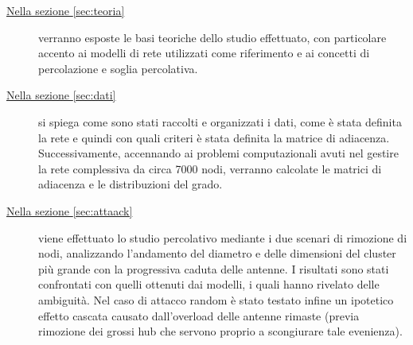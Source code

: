 \begin{description}
\item[{\hyperref[sec:teoria]{Nella sezione \ref{sec:teoria}}}] verranno esposte le basi teoriche dello studio effettuato, con particolare accento ai modelli di rete utilizzati come riferimento e ai concetti di percolazione e soglia percolativa.

\item[{\hyperref[sec:dati]{Nella sezione \ref{sec:dati}}}] si spiega come sono stati raccolti e organizzati i dati, come è stata definita la rete e quindi con quali criteri è stata definita la matrice di adiacenza. Successivamente, accennando ai problemi computazionali avuti nel gestire la rete complessiva da circa 7000 nodi, verranno calcolate le matrici di adiacenza e le distribuzioni del grado.

\item[{\hyperref[sec:attaack]{Nella sezione \ref{sec:attaack}}}] viene effettuato lo studio percolativo mediante i due scenari di rimozione di nodi,  analizzando l'andamento del diametro e delle dimensioni del cluster più grande con la progressiva caduta delle antenne. I risultati sono stati confrontati con quelli ottenuti dai modelli, i quali hanno rivelato delle ambiguità. Nel caso di attacco random è stato testato infine un ipotetico effetto cascata causato dall'overload delle antenne rimaste (previa rimozione dei grossi hub che servono proprio a scongiurare tale evenienza).

\end{description}


